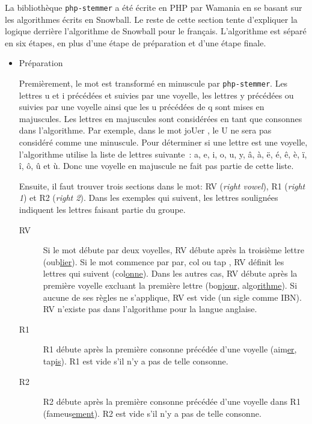 La biblioth\`eque \texttt{php-stemmer} a été écrite en PHP par Wamania en se basant sur les algorithmes écrits en Snowball.
Le reste de cette section tente d'expliquer la logique derrière l'algorithme de Snowball pour le français.
L'algorithme est séparé en six étapes, en plus d'une étape de préparation et d'une étape finale.

\begin{itemize}

\item{Préparation}

Premièrement, le mot est transformé en minuscule par \texttt{php-stemmer}.
Les lettres u et i précédées et suivies par une voyelle, les lettres y précédées ou suivies par une voyelle ainsi que les u précédées de q sont mises en majuscules.
Les lettres en majuscules sont considérées en tant que consonnes dans l'algorithme.
Par exemple, dans le mot \og joUer \fg{}, le U ne sera pas considéré comme une minuscule.
Pour déterminer si une lettre est une voyelle, l'algorithme utilise la liste de lettres suivante~: a, e, i, o, u, y, â, à, ë, é, ê, è, ï, î, ô, û et ù.
Donc une voyelle en majuscule ne fait pas partie de cette liste.

Ensuite, il faut trouver trois sections dans le mot: RV (\emph{right vowel}), R1 (\emph{right 1}) et R2 (\emph{right 2}).
Dans les exemples qui suivent, les lettres soulignées indiquent les lettres faisant partie du groupe.

\begin{description}
  \item[RV]
  
  Si le mot débute par deux voyelles, RV débute après la troisième lettre (oub\underline{lier}).
  Si le mot commence par \og par, col ou tap \fg{}, RV définit les lettres qui suivent (col\underline{onne}).
  Dans les autres cas, RV débute après la première voyelle excluant la première lettre (bo\underline{njour}, algo\underline{rithme}).
  Si aucune de ses règles ne s'applique, RV est vide (un sigle comme IBN).
  RV n'existe pas dans l'algorithme pour la langue anglaise.
  
  \item[R1]
  
  R1 débute après la première consonne précédée d'une voyelle (aim\underline{er}, tap\underline{is}).
  R1 est vide s'il n'y a pas de telle consonne.
  
  \item[R2]
  
  R2 débute après la première consonne précédée d'une voyelle dans R1 (fameus\underline{ement}).
  R2 est vide s'il n'y a pas de telle consonne.
\end{description}


\end{itemize}
